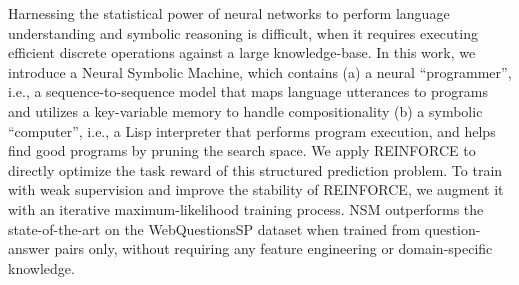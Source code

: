 Harnessing the statistical power of neural networks to perform language understanding and symbolic reasoning is difficult, when it requires executing efficient discrete operations against a large knowledge-base. In this work, we introduce a Neural Symbolic Machine, which contains (a) a neural ``programmer'', i.e., a sequence-to-sequence model that maps language utterances to programs and utilizes a key-variable memory to handle compositionality (b) a symbolic ``computer'', i.e., a Lisp interpreter that performs program execution, and helps find good programs by pruning the search space. We apply REINFORCE to directly optimize the task reward of this structured prediction problem. To train with weak supervision and improve the stability of REINFORCE, we augment it with an iterative maximum-likelihood training process. NSM outperforms the state-of-the-art on the WebQuestionsSP dataset when trained from question-answer pairs only, without requiring any feature engineering or domain-specific knowledge.
